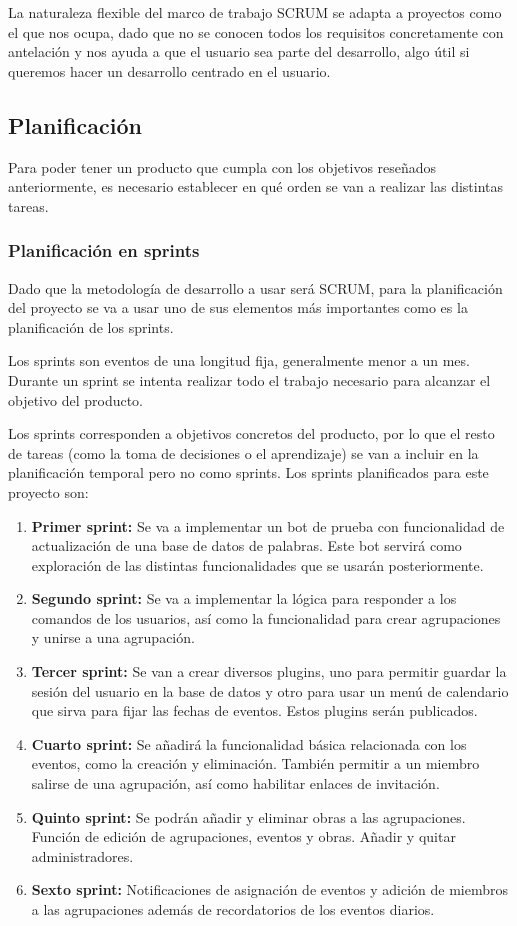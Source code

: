 La naturaleza flexible del marco de trabajo SCRUM se adapta a proyectos como el que nos ocupa, dado que no se conocen todos los requisitos concretamente con antelación y nos ayuda a que el usuario sea parte del desarrollo, algo útil si queremos hacer un desarrollo centrado en el usuario.

\subsection{Planificación}

Para poder tener un producto que cumpla con los objetivos reseñados anteriormente, es necesario establecer en qué orden se van a realizar las distintas tareas.


\subsubsection{Planificación en sprints}

Dado que la metodología de desarrollo a usar será SCRUM, para la planificación del proyecto se va a usar uno de sus elementos más importantes como es la planificación de los sprints. 

Los sprints son eventos de una longitud fija, generalmente menor a un mes. Durante un sprint se intenta realizar todo el trabajo necesario para alcanzar el objetivo del producto.

Los sprints corresponden a objetivos concretos del producto, por lo que el resto de tareas (como la toma de decisiones o el aprendizaje) se van a incluir en la planificación temporal pero no como sprints. Los sprints planificados para este proyecto son:

\begin{enumerate}

\item \textbf{Primer sprint:} Se va a implementar un bot de prueba con funcionalidad de actualización de una base de datos de palabras. Este bot servirá como exploración de las distintas funcionalidades que se usarán posteriormente.
\item \textbf{Segundo sprint:} Se va a implementar la lógica para responder a los comandos de los usuarios, así como la funcionalidad para crear agrupaciones y unirse a una agrupación.
\item \textbf{Tercer sprint:} Se van a crear diversos plugins, uno para permitir guardar la sesión del usuario en la base de datos y otro para usar un menú de calendario que sirva para fijar las fechas de eventos. Estos plugins serán publicados.
\item \textbf{Cuarto sprint:} Se añadirá la funcionalidad básica relacionada con los eventos, como la creación y eliminación. También permitir a un miembro salirse de una agrupación, así como habilitar enlaces de invitación.
\item \textbf{Quinto sprint:} Se podrán añadir y eliminar obras a las agrupaciones. Función de edición de agrupaciones, eventos y obras. Añadir y quitar administradores.
\item \textbf{Sexto sprint:} Notificaciones de asignación de eventos y adición de miembros a las agrupaciones además de recordatorios de los eventos diarios.
\end{enumerate}

